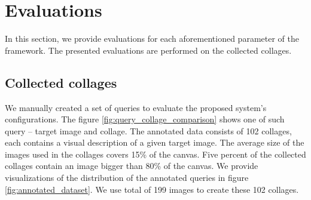 



\chapter{Evaluations}
\label{ch:evaluation}

In this section, we provide evaluations for each aforementioned parameter of the framework. The presented evaluations are performed on the collected collages.

\section{Collected collages}

We manually created a set of queries to evaluate the proposed system's configurations. The figure \ref{fig:query_collage_comparison} shows one of such query -- target image and collage. The annotated data consists of 102 collages, each contains a visual description of a given target image. The average size of the images used in the collages covers 15\% of the canvas. Five percent of the collected collages contain an image bigger than 80\% of the canvas. We provide visualizations of the distribution of the annotated queries in figure \ref{fig:annotated_dataset}. We use total of 199 images to create these 102 collages.


